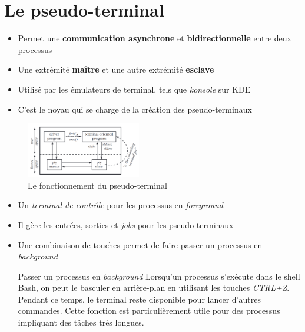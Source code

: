 \section{Le pseudo-terminal}

\begin{frame}
	\begin{itemize}
		\item Permet une \textbf{communication asynchrone} et \textbf{bidirectionnelle} entre deux processus
		\item Une extrémité \textbf{maître} et une autre extrémité \textbf{esclave}
		
		\item Utilisé par les émulateurs de terminal, tels que \textit{konsole} sur KDE

		\item C'est le noyau qui se charge de la création des pseudo-terminaux

	\end{itemize}

	\begin{figure}
		\centering
		\includegraphics[width=5cm]{images/pseudo-terminal.png}
		\caption{Le fonctionnement du pseudo-terminal}
	\end{figure}
\end{frame}

\begin{frame}
	\begin{itemize}
		\item Un \textit{terminal de contrôle} pour les processus en \textit{foreground}

		\item Il gère les entrées, sorties et \textit{jobs} pour les pseudo-terminaux

		\item Une combinaison de touches permet de faire passer un processus en \textit{background}

			\begin{block}{Passer un processus en \textit{background}}
				Lorsqu'un processus s'exécute dans le shell Bash, on peut le basculer en arrière-plan en utilisant les touches \textit{CTRL+Z}. Pendant ce temps, le terminal reste disponible pour lancer d'autres commandes. Cette fonction est particulièrement utile pour des processus impliquant des tâches très longues.
			\end{block}
	\end{itemize}
\end{frame}

